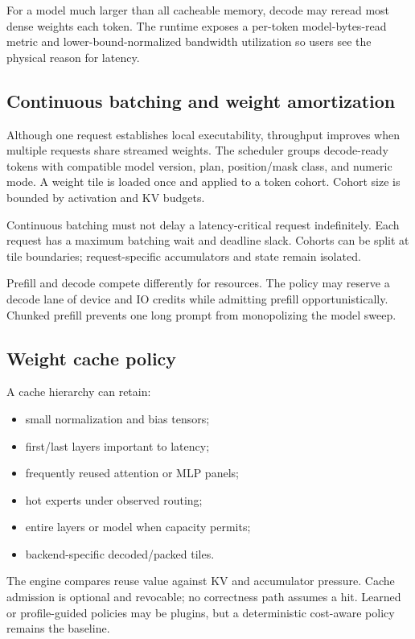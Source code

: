 For a model much larger than all cacheable memory, decode may reread most dense weights each token. The runtime exposes a per-token model-bytes-read metric and lower-bound-normalized bandwidth utilization so users see the physical reason for latency.

\subsection{Continuous batching and weight amortization}

Although one request establishes local executability, throughput improves when multiple requests share streamed weights. The scheduler groups decode-ready tokens with compatible model version, plan, position/mask class, and numeric mode. A weight tile is loaded once and applied to a token cohort. Cohort size is bounded by activation and KV budgets.

Continuous batching must not delay a latency-critical request indefinitely. Each request has a maximum batching wait and deadline slack. Cohorts can be split at tile boundaries; request-specific accumulators and state remain isolated.

Prefill and decode compete differently for resources. The policy may reserve a decode lane of device and IO credits while admitting prefill opportunistically. Chunked prefill prevents one long prompt from monopolizing the model sweep.

\subsection{Weight cache policy}

A cache hierarchy can retain:

\begin{itemize}
  \item small normalization and bias tensors;
  \item first/last layers important to latency;
  \item frequently reused attention or MLP panels;
  \item hot experts under observed routing;
  \item entire layers or model when capacity permits;
  \item backend-specific decoded/packed tiles.
\end{itemize}

The engine compares reuse value against KV and accumulator pressure. Cache admission is optional and revocable; no correctness path assumes a hit. Learned or profile-guided policies may be plugins, but a deterministic cost-aware policy remains the baseline.


